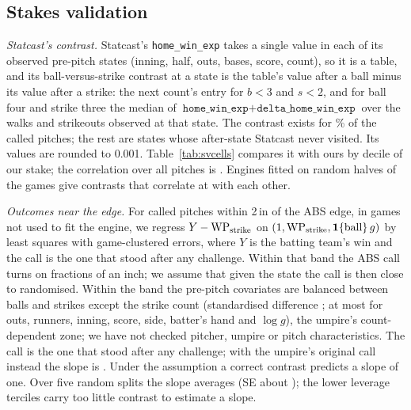\documentclass[aoas]{imsart}
\theoremstyle{plain}
\theoremstyle{definition}
\begin{document}
\begin{table}[!htbp]
\caption{Theorem~\ref{thm:flatS} on the calibrated pools, home and away sides pooled. Loss: $1-V^\delta/V^\star$.
Identity gap: largest difference between $V^\star-V^\delta$ and the sum in (i).}\label{tab:flat}
\centering\small

\end{table}

\subsection{Stakes validation}\label{sec:stakesval}
\emph{Statcast's contrast.} Statcast's \texttt{home\_win\_exp} takes a single value in each of its observed pre-pitch
states (inning, half, outs, bases, score, count), so it is a table, and its ball-versus-strike contrast at a state is
the table's value after a ball minus its value after a strike: the next count's entry for $b<3$ and $s<2$, and for ball
four and strike three the median of $\texttt{home\_win\_exp}+\texttt{delta\_home\_win\_exp}$ over the walks and
strikeouts observed at that state. The contrast exists for \SVSharePct\% of the called pitches; the rest are states
whose after-state Statcast never visited. Its values are rounded to 0.001. Table~\ref{tab:svcells} compares it with
ours by decile of our stake; the correlation over all pitches is \SVCorr. Engines fitted on random halves of the games
give contrasts that correlate at \SVHalfCorr{} with each other.
\begin{table}[!htbp]
\caption{Ball-versus-strike contrast (batting team, WP): ours against Statcast's own win expectancy, by decile of our
stake $g$.}\label{tab:svcells}
\centering\small

\end{table}

\emph{Outcomes near the edge.} For called pitches within 2\,in of the ABS edge, in games not used to fit the engine,
we regress $Y-\mathrm{WP}_{\rm strike}$ on $(1,\mathrm{WP}_{\rm strike},\mathbf 1\{\text{ball}\}\,g)$ by least squares
with game-clustered errors, where $Y$ is the batting team's win and the call is the one that stood after any
challenge. Within that band the ABS call turns on fractions of an inch; we assume that given the state the call is then close to
randomised. Within the band the pre-pitch covariates are balanced between balls and strikes except the strike count
(standardised difference \EdgeStrikesSD; at most \EdgeOtherSDMax{} for outs, runners, inning, score, side, batter's
hand and $\log g$), the umpire's count-dependent zone; we have not checked pitcher, umpire or pitch characteristics. The
call is the one that stood after any challenge; with the umpire's original call instead the slope is \EdgeOrigSlope{}
\EdgeOrigSlopeCI. Under the assumption a correct contrast predicts a slope of one. Over five random splits the slope averages \SVSlope{} (SE about
\SVSlopeSE); the lower leverage terciles carry too little contrast to estimate a slope.
\end{document}
